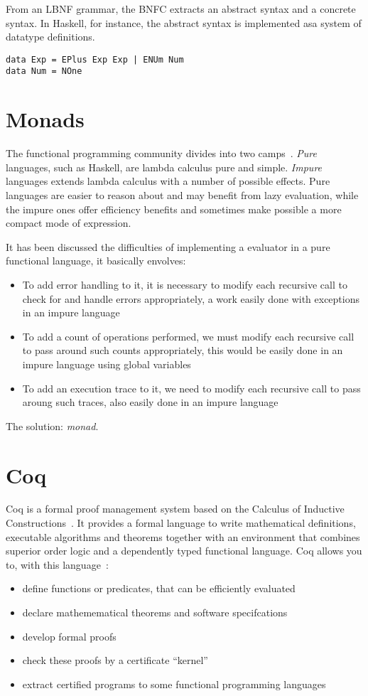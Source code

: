 From an LBNF grammar, the BNFC extracts an abstract syntax and a concrete
syntax. In Haskell, for instance, the abstract syntax is implemented asa system
of datatype definitions.

\begin{verbatim}
data Exp = EPlus Exp Exp | ENUm Num
data Num = NOne
\end{verbatim}

\section{Monads}

The functional programming community divides into two camps~\cite{monadswadler}.
\textit{Pure} languages, such as Haskell, are lambda calculus pure and simple.
\textit{Impure} languages extends lambda calculus with a number of possible
effects. Pure languages are easier to reason about and may benefit from lazy
evaluation, while the impure ones offer efficiency benefits and sometimes make
possible a more compact mode of expression. 

It has been discussed the difficulties of implementing a evaluator in a pure
functional language, it basically envolves:
\begin{itemize}
\item To add error handling to it, it is necessary to modify each recursive call to
check for and handle errors appropriately, a work easily done with exceptions in
an impure language
\item To add a count of operations performed, we must modify each
recursive call to pass around such counts appropriately, this would be easily
done in an impure language using global variables
\item To add an execution trace to it, we need to modify each recursive call to
pass aroung such traces, also easily done in an impure language
\end{itemize}

The solution: \textit{monad}.

\section{Coq} 
Coq is a formal proof management system based on the Calculus of Inductive
Constructions~\cite{coqart}. It provides a formal language to write mathematical
definitions, executable algorithms and theorems together with an environment
that combines superior order logic and a dependently typed functional language.
Coq allows you to, with this language~\cite{coqsite}:
\begin{itemize}
\item define functions or predicates, that can be efficiently evaluated
\item declare mathemematical theorems and software specifcations
\item develop formal proofs
\item check these proofs by a certificate ``kernel''
\item extract certified programs to some functional programming languages
\end{itemize}


